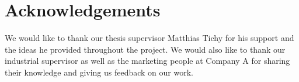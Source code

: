 \documentclass{sig-alternate}
\begin{document}
\section{Acknowledgements}
We would like to thank our thesis supervisor Matthias Tichy for his support and the ideas he provided throughout the project. We would also like to thank our industrial supervisor as well as the marketing people at Company A for sharing their knowledge and giving us feedback on our work.



\end{document}

